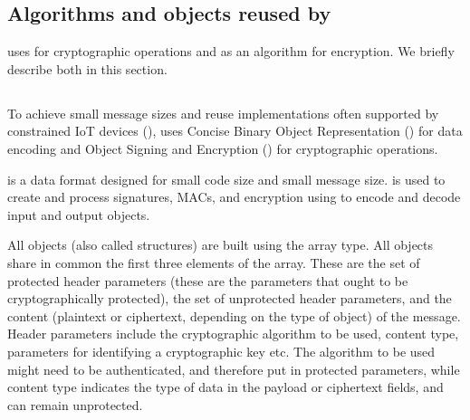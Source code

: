 {\subsection{Algorithms and objects reused by \mEdhoc{}}
\mEdhoc{} uses \mCose{} for cryptographic operations and \mAead{} as an algorithm for encryption. We briefly describe both in this section.

\subsection{\mCose}
To achieve small message sizes and reuse implementations often supported by constrained IoT devices (\mcneed), \mEdhoc{} uses Concise Binary Object Representation (\mCbor) for data encoding and \mCbor{} Object Signing and Encryption (\mCose) for cryptographic operations. 


\mCbor{} is a data format designed for small code size and small message size. \mCose{} is used to create and process signatures, MACs, and encryption using \mCbor{} to encode and decode input and output objects.

All \mCose{} objects (also called structures) are built using the \mCbor{} array type. All objects share in common the first three elements of the array. These are the set of protected header parameters (these are the parameters that ought to be cryptographically protected), the set of unprotected header parameters, and the content (plaintext or ciphertext, depending on the type of \mCose{} object) of the message. Header parameters include the cryptographic algorithm to be used, content type, parameters for identifying a cryptographic key etc. The algorithm to be used might need to be authenticated, and therefore put in protected parameters, while content type indicates the type of data in the payload or ciphertext fields, and can remain unprotected.

}
